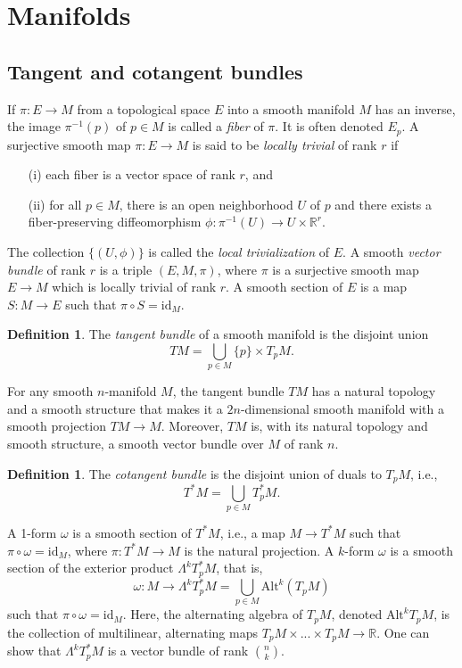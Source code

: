 \documentclass{article}
\theoremstyle{plain}
\theoremstyle{definition}
\newtheorem{defin}[teo]{Definition}
\numberwithin{equation}{section}
\newcommand{\R}{\ensuremath{\mathbb{R}}}
\newcommand{\Alt}{\ensuremath{\mathrm{Alt}}}
\newcommand{\id}{\ensuremath{\mathrm{id}}}
\begin{document}
\section{Manifolds}
\subsection{Tangent and cotangent bundles}
If $\pi:E\to M$ from a topological space $E$ into a smooth manifold $M$ has an inverse, the image $\pi^{-1}(p)$ of $p\in M$ is called a \textit{fiber} of $\pi$. It is often denoted $E_p$. A surjective smooth map $\pi: E\to M$ is said to be \textit{locally trivial} of rank $r$ if
\begin{enumerate}
	\item[(i)] each fiber is a vector space of rank $r$, and
	\item[(ii)] for all $p\in M$, there is an open neighborhood $U$ of $p$ and there exists a fiber-preserving diffeomorphism $\phi:\pi^{-1}(U)\to U\times \R^r$.
\end{enumerate}
%
The collection $\{(U,\phi)\}$ is called the \textit{local trivialization} of $E$.	A smooth \textit{vector bundle} of rank $r$ is a triple $(E,M,\pi)$, where $\pi$ is a surjective smooth map $E\to M$ which is locally trivial of rank $r$. A smooth section of $E$ is a map $S:M\to E$ such that $\pi\circ S=\id_M$. 

\begin{defin}
	The \textit{tangent bundle} of a smooth manifold is the disjoint union
	\[
	TM=\bigcup_{p\in M}\{p\}\times T_pM.
	\]
\end{defin}

For any smooth $n$-manifold $M$, the tangent bundle $TM$ has a natural topology and a smooth structure that makes it a $2n$-dimensional smooth manifold with a smooth projection $TM\to M$. Moreover, $TM$ is, with its natural topology and smooth structure, a smooth vector bundle over $M$ of rank $n$.

\begin{defin}
	The \textit{cotangent bundle} is the disjoint union of duals to $T_pM$, i.e.,
	\[
	T^*M = \bigcup_{p\in M} T_p^*M.
	\]
\end{defin}

A 1-form $\omega$ is a smooth section of $T^*M$, i.e., a map $M\to T^*M$ such that $\pi\circ \omega=\id_M$, where $\pi:T^*M\to M$ is the natural projection. A $k$-form $\omega$ is a smooth section of the exterior product $\Lambda^kT_p^*M$, that is,
\[
 \omega:M\to \Lambda^kT_p^*M = \bigcup_{p\in M}\Alt^k(T_pM)
\]
such that $\pi\circ \omega=\id_M$. Here, the alternating algebra of $T_pM$, denoted $\Alt^kT_pM$, is the collection of multilinear, alternating maps $T_pM\times ...\times T_pM\to \R$. One can show that $\Lambda^kT_p^*M$ is a vector bundle of rank $\binom{n}{k}$.
\end{document}
